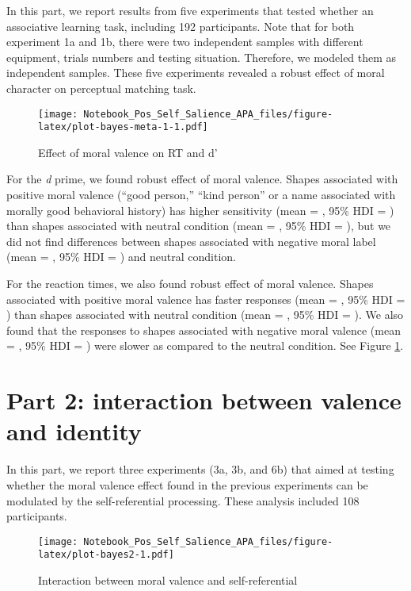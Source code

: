 \documentclass[
  english,
  man]{apa6}
\begin{document}
In this part, we report results from five experiments that tested whether an associative learning task, including 192 participants. Note that for both experiment 1a and 1b, there were two independent samples with different equipment, trials numbers and testing situation. Therefore, we modeled them as independent samples. These five experiments revealed a robust effect of moral character on perceptual matching task.

\begin{figure}
\centering
\texttt{[image: Notebook\_Pos\_Self\_Salience\_APA\_files/figure-latex/plot-bayes-meta-1-1.pdf]}
\caption{\label{fig:plot-bayes-meta-1}Effect of moral valence on RT and d'}
\end{figure}

For the \emph{d} prime, we found robust effect of moral valence. Shapes associated with positive moral valence (``good person,'' ``kind person'' or a name associated with morally good behavioral history) has higher sensitivity (mean = , 95\% HDI = ) than shapes associated with neutral condition (mean = , 95\% HDI = ), but we did not find differences between shapes associated with negative moral label (mean = , 95\% HDI = ) and neutral condition.

For the reaction times, we also found robust effect of moral valence. Shapes associated with positive moral valence has faster responses (mean = , 95\% HDI = ) than shapes associated with neutral condition (mean = , 95\% HDI = ). We also found that the responses to shapes associated with negative moral valence (mean = , 95\% HDI = ) were slower as compared to the neutral condition. See Figure \ref{fig:plot-bayes-meta-1}.

\hypertarget{part-2-interaction-between-valence-and-identity}{%
\section{Part 2: interaction between valence and identity}\label{part-2-interaction-between-valence-and-identity}}

In this part, we report three experiments (3a, 3b, and 6b) that aimed at testing whether the moral valence effect found in the previous experiments can be modulated by the self-referential processing. These analysis included 108 participants.

\begin{figure}
\centering
\texttt{[image: Notebook\_Pos\_Self\_Salience\_APA\_files/figure-latex/plot-bayes2-1.pdf]}
\caption{\label{fig:plot-bayes2}Interaction between moral valence and self-referential}
\end{figure}
\end{document}
